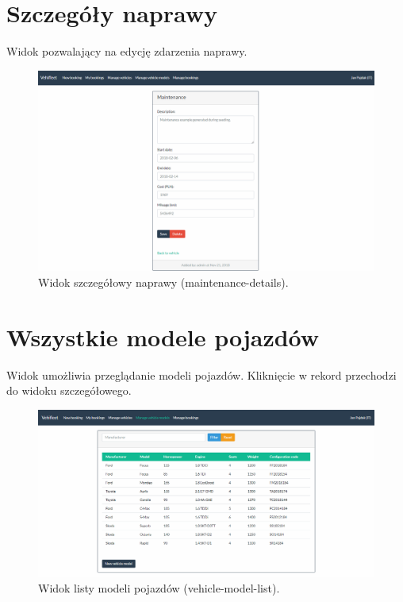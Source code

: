 \documentclass[eng,printmode,openany]{mgr}
\begin{document}
	\section{Szczegóły naprawy}
	Widok pozwalający na edycję zdarzenia naprawy.
	\begin{figure}[H]
		\centering
		\includegraphics[scale=0.32]{images/views/maintenance-detail.png}
		\caption{Widok szczegółowy naprawy (maintenance-details).}
	\end{figure}

	\newpage	
	\section{Wszystkie modele pojazdów}	
	Widok umożliwia przeglądanie modeli pojazdów. Kliknięcie w rekord przechodzi do widoku szczegółowego.
	\begin{figure}[H]
		\centering
		\includegraphics[width=\textwidth]{images/views/vehicle-model-list.png}
		\caption{Widok listy modeli pojazdów (vehicle-model-list).}
	\end{figure}
	
	\newpage
\end{document}
